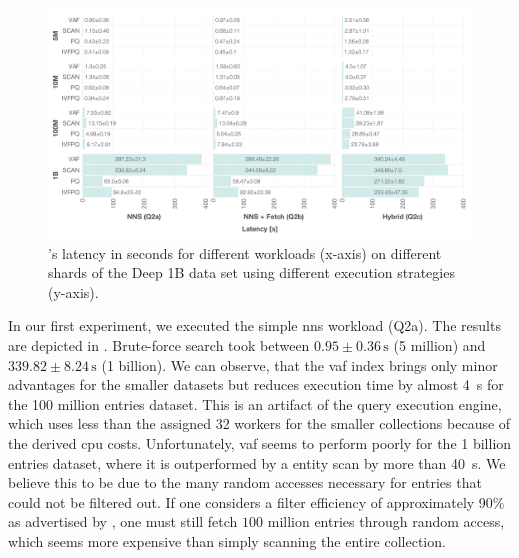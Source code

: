 \begin{landscape}
    \begin{figure}[p]
        \centering
        \includegraphics[width=1.55\textwidth]{figures/bignns/cottontail/bignns-cottontail-runtime}
        \caption {\cottontail{}'s latency in seconds for different workloads (x-axis) on different shards of the Deep 1B data set using different execution strategies (y-axis).}
        \label{figure:cottontail_runtime}
    \end{figure}
\end{landscape}

In our first experiment, we executed the simple \acrshort{nns} workload (Q2a). The results are depicted in . Brute-force search took between $0.95 \pm 0.36 \, \si{\second}$ (5 million) and $339.82 \pm 8.24 \, \si{\second}$ (1 billion). We can observe, that the \acrshort{vaf} index brings only minor advantages for the smaller datasets but reduces execution time by almost \SI{4}{\second} for the 100 million entries dataset. This is an artifact of the query execution engine, which uses less than the assigned 32 workers for the smaller collections because of the derived \acrshort{cpu} costs. Unfortunately, \acrshort{vaf} seems to perform poorly for the 1 billion entries dataset, where it is outperformed by a entity scan by more than \SI{40}{\second}. We believe this to be due to the many random accesses necessary for entries that could not be filtered out. If one considers a filter efficiency of approximately 90\% as advertised by \cite{Weber:1998Va}, one must still fetch $100$ million entries through random access, which seems more expensive than simply scanning the entire collection.

